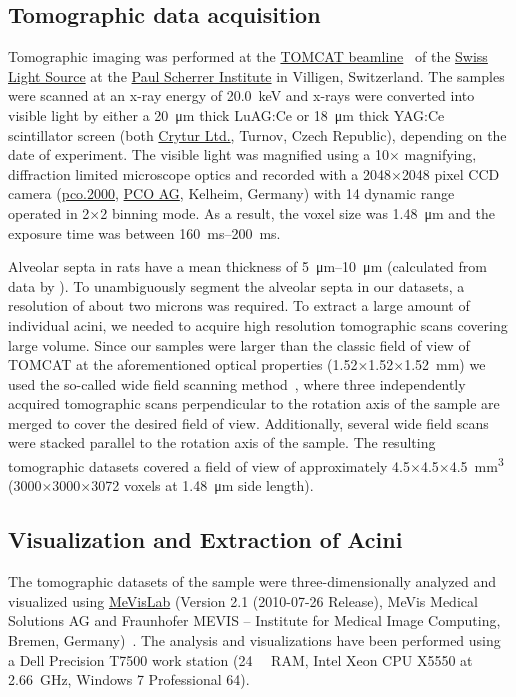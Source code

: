 \documentclass[a4paper,DIV=calc,abstract,english]{scrartcl}
\begin{document}
\subsection{Tomographic data acquisition}
Tomographic imaging was performed at the \href{http://www.psi.ch/sls/tomcat/}{TOMCAT beamline}~\citep{Stampanoni2006a} of the \href{http://www.psi.ch/sls/}{Swiss Light Source} at the \href{http://www.psi.ch/}{Paul Scherrer Institute} in Villigen, Switzerland.
The samples were scanned at an x-ray energy of \SI{20.0}{\kilo\electronvolt} and x-rays were converted into visible light by either a \SI{20}{\micro\meter} thick LuAG:Ce or \SI{18}{\micro\meter} thick YAG:Ce scintillator screen (both \href{http://www.crytur.cz/}{Crytur Ltd.}, Turnov, Czech Republic), depending on the date of experiment.
The visible light was magnified using a 10\(\times\) magnifying, diffraction limited microscope optics and recorded with a 2048\(\times\)2048 pixel CCD camera (\href{http://www.pco.de/sensitive-cameras/pco2000/}{pco.2000}, \href{http://www.pco.de/}{PCO AG}, Kelheim, Germany) with \SI{14}{\bit} dynamic range operated in 2\(\times\)2 binning mode.
As a result, the voxel size was \SI{1.48}{\micro\meter} and the exposure time was between \SIrange{160}{200}{\milli\second}.

Alveolar septa in rats have a mean thickness of \SIrange{5}{10}{\micro\meter} (calculated from data by \citet{Burri1974}).
To unambiguously segment the alveolar septa in our datasets, a resolution of about two microns was required.
To extract a large amount of individual acini, we needed to acquire high resolution tomographic scans covering large volume.
Since our samples were larger than the classic field of view of TOMCAT at the aforementioned optical properties (1.52\(\times\)1.52\(\times\)\SI{1.52}{\milli\meter}) we used the so-called wide field scanning method~\citep{Haberthuer2010a}, where three independently acquired tomographic scans perpendicular to the rotation axis of the sample are merged to cover the desired field of view.
Additionally, several wide field scans were stacked parallel to the rotation axis of the sample.
The resulting tomographic datasets covered a field of view of approximately 4.5\(\times\)4.5\(\times\)\SI{4.5}{\milli\meter\cubed} (3000\(\times\)3000\(\times\)3072 voxels at \SI{1.48}{\micro\meter} side length).

\subsection{Visualization and Extraction of Acini}
The tomographic datasets of the sample were three-dimensionally analyzed and visualized using \href{http://mevislab.de}{MeVisLab} (Version 2.1 (2010-07-26 Release), MeVis Medical Solutions AG and Fraunhofer MEVIS -- Institute for Medical Image Computing, Bremen, Germany)~\citep{Bitter2007}.
The analysis and visualizations have been performed using a Dell Precision T7500 work station (\SI{24}{\giga\byte} RAM, Intel Xeon CPU X5550 at \SI{2.66}{\giga\hertz}, Windows 7 Professional \SI{64}{\bit}).
\end{document}
